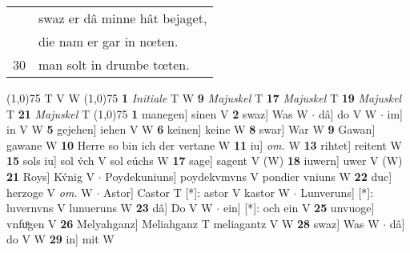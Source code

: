 \documentclass[8pt,a4paper,notitlepage]{article}
\begin{document}
\begin{table}[ht]
\begin{minipage}[t]{0.5\linewidth}
\begin{tabular}{rl}
 & swaz er dâ minne hât bejaget,\\ 
 & die nam er gar in nœten.\\ 
30 & man solt in drumbe tœten.\\ 
\end{tabular}
\scriptsize
\line(1,0){75} \newline
T V W \newline
\line(1,0){75} \newline
\textbf{1} \textit{Initiale} T W  \textbf{9} \textit{Majuskel} T  \textbf{17} \textit{Majuskel} T  \textbf{19} \textit{Majuskel} T  \textbf{21} \textit{Majuskel} T  \newline
\line(1,0){75} \newline
\textbf{1} manegen] sinen V \textbf{2} swaz] Was W  $\cdot$ dâ] do V W  $\cdot$ im] in V W \textbf{5} gejehen] iehen V W \textbf{6} keinen] keine W \textbf{8} swar] War W \textbf{9} Gawan] gawane W \textbf{10} Herre so bin ich der vertane W \textbf{11} iu] \textit{om.} W \textbf{13} rihtet] reitent W \textbf{15} sols iu] sol v́ch V sol eúchs W \textbf{17} sage] sagent V (W) \textbf{18} iuwern] uwer V (W) \textbf{21} Roys] Kv́nig V  $\cdot$ Poydekuniuns] poydekvmvns V pondier vniuns W \textbf{22} duc] herzoge V \textit{om.} W  $\cdot$ Astor] Castor T [*]: astor V kastor W  $\cdot$ Lunveruns] [*]: luvernvns V lunueruns W \textbf{23} dâ] Do V W  $\cdot$ ein] [*]: och ein V \textbf{25} unvuoge] vnfuͦgen V \textbf{26} Melyahganz] Meliahganz T meliagantz V W \textbf{28} swaz] Was W  $\cdot$ dâ] do V W \textbf{29} in] mit W \newline
\end{minipage}
\end{table}
\end{document}
